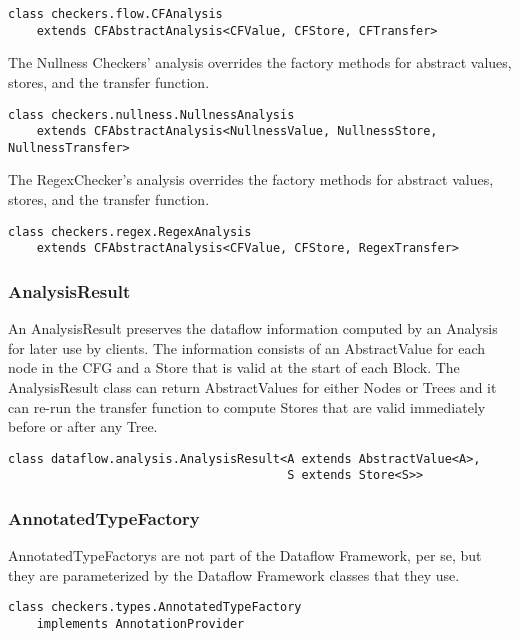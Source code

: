     \begin{verbatim}class checkers.flow.CFAnalysis
    extends CFAbstractAnalysis<CFValue, CFStore, CFTransfer>\end{verbatim}

    The Nullness Checkers' analysis overrides the factory methods for abstract values, stores, and the transfer function.

    \begin{verbatim}class checkers.nullness.NullnessAnalysis
    extends CFAbstractAnalysis<NullnessValue, NullnessStore, NullnessTransfer>\end{verbatim}
    
    The RegexChecker's analysis overrides the factory methods for abstract values, stores, and the transfer function.

    \begin{verbatim}class checkers.regex.RegexAnalysis
    extends CFAbstractAnalysis<CFValue, CFStore, RegexTransfer>\end{verbatim}


\subsubsection{AnalysisResult}
\label{sec:analysis_result_class}

    An AnalysisResult preserves the dataflow information computed by an Analysis for later use by clients.  The information consists of an AbstractValue for each node in the CFG and a Store that is valid at the start of each Block.  The AnalysisResult class can return AbstractValues for either Nodes or Trees and it can re-run the transfer function to compute Stores that are valid immediately before or after any Tree.

    \begin{verbatim}class dataflow.analysis.AnalysisResult<A extends AbstractValue<A>,
                                       S extends Store<S>>\end{verbatim}


\subsubsection{AnnotatedTypeFactory}
\label{sec:annotated_type_factory_classes}

    AnnotatedTypeFactorys are not part of the Dataflow Framework, per se, but they are parameterized by the Dataflow Framework classes that they use.

    \begin{verbatim}class checkers.types.AnnotatedTypeFactory
    implements AnnotationProvider\end{verbatim}
    
